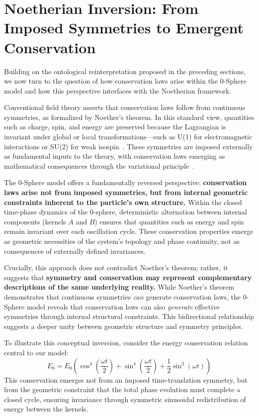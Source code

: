 \documentclass[%
 reprint,
 amsmath,amssymb,
 aps,
]{revtex4-1}
\numberwithin{equation}{section}%
\begin{document}
\section{Noetherian Inversion: From Imposed Symmetries to Emergent Conservation}

Building on the ontological reinterpretation proposed in the preceding sections, we now turn to the question of how conservation laws arise within the 0-Sphere model and how this perspective interfaces with the Noetherian framework.

Conventional field theory asserts that conservation laws follow from continuous symmetries, as formalized by Noether's theorem. In this standard view, quantities such as charge, spin, and energy are preserved because the Lagrangian is invariant under global or local transformations—such as U(1) for electromagnetic interactions or SU(2) for weak isospin~\cite{tinkham1964}. These symmetries are imposed externally as fundamental inputs to the theory, with conservation laws emerging as mathematical consequences through the variational principle~\cite{hill1951}.

The 0-Sphere model offers a fundamentally reversed perspective: \textbf{conservation laws arise not from imposed symmetries, but from internal geometric constraints inherent to the particle's own structure.} Within the closed time-phase dynamics of the 0-sphere, deterministic alternation between internal components (kernels $A$ and $B$) ensures that quantities such as energy and spin remain invariant over each oscillation cycle. These conservation properties emerge as geometric necessities of the system's topology and phase continuity, not as consequences of externally defined invariances.

Crucially, this approach does not contradict Noether's theorem; rather, it suggests that \textbf{symmetry and conservation may represent complementary descriptions of the same underlying reality.} While Noether's theorem demonstrates that continuous symmetries \emph{can} generate conservation laws, the 0-Sphere model reveals that conservation laws can also \emph{generate} effective symmetries through internal structural constraints. This bidirectional relationship suggests a deeper unity between geometric structure and symmetry principles.

To illustrate this conceptual inversion, consider the energy conservation relation central to our model:
\begin{equation}
E_0 = E_0 \left( \cos^4\left(\frac{\omega t}{2}\right) + \sin^4\left(\frac{\omega t}{2}\right) + \frac{1}{2}\sin^2(\omega t) \right)
\end{equation}
This conservation emerges not from an imposed time-translation symmetry, but from the geometric constraint that the total phase evolution must complete a closed cycle, ensuring invariance through symmetric sinusoidal redistribution of energy between the kernels.
\end{document}
